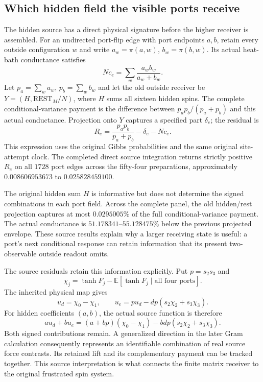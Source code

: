 \subsection{Which hidden field the visible ports receive}

The hidden source has a direct physical signature before the higher receiver is assembled. For an undirected port-flip edge with port endpoints $a,b$, retain every outside configuration $w$ and write $a_w=\pi(a,w)$, $b_w=\pi(b,w)$. Its actual heat-bath conductance satisfies
\[
 Nc_e=\sum_w\frac{a_wb_w}{a_w+b_w}.
\]
Let $p_a=\sum_w a_w$, $p_b=\sum_w b_w$ and let the old outside receiver be $Y=(H,\mathrm{REST}_M/N)$, where $H$ sums all sixteen hidden spins. The complete conditional-variance payment is the difference between $p_ap_b/(p_a+p_b)$ and this actual conductance. Projection onto $Y$ captures a specified part $\delta_e$; the residual is
\[
 R_e=\frac{p_ap_b}{p_a+p_b}-\delta_e-Nc_e.
\]
This expression uses the original Gibbs probabilities and the same original site-attempt clock. The completed direct source integration returns strictly positive $R_e$ on all $1728$ port edges across the fifty-four preparations, approximately $0.008606953673$ to $0.025828459100$. 

The original hidden sum $H$ is informative but does not determine the signed combinations in each port field. Across the complete panel, the old hidden/rest projection captures at most $0.0295005\%$ of the full conditional-variance payment. The actual conductance is $51.178341$--$55.128475\%$ below the previous projected envelope. These source results explain why a larger receiving state is useful: a port's next conditional response can retain information that its present two-observable outside readout omits.

The source residuals retain this information explicitly. Put $p=s_2s_3$ and
\[
 \chi_j=\tanh F_j-\mathbb E[\tanh F_j\mid\text{all four ports}].
\]
The inherited physical map gives
\[
 u_d=\chi_0-\chi_1,\qquad
 u_e=p u_d-dp(s_2\chi_2+s_3\chi_3).
\]
For hidden coefficients $(a,b)$, the actual source function is therefore
\[
 au_d+bu_e=(a+bp)(\chi_0-\chi_1)
                         -bdp(s_2\chi_2+s_3\chi_3).
\]
Both signed contributions remain. A generalized direction in the later Gram calculation consequently represents an identifiable combination of real source force contrasts. Its retained lift and its complementary payment can be tracked together. This source interpretation is what connects the finite matrix receiver to the original frustrated spin system.

